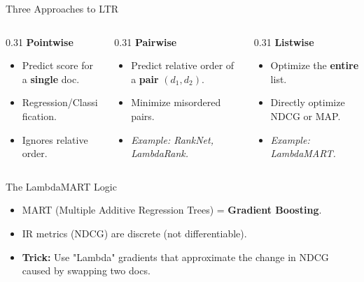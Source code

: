 \documentclass[aspectratio=169]{beamer}
\begin{document}
\begin{frame}{Three Approaches to LTR}
\begin{columns}
\begin{column}{0.31\textwidth}
\textbf{Pointwise}
\begin{itemize}
    \item Predict score for a \textbf{single} doc.
    \item Regression/Classification.
    \item Ignores relative order.
\end{itemize}
\end{column}

\begin{column}{0.31\textwidth}
\textbf{Pairwise}
\begin{itemize}
    \item Predict relative order of a \textbf{pair} $(d_1, d_2)$.
    \item Minimize misordered pairs.
    \item \textit{Example: RankNet, LambdaRank.}
\end{itemize}
\end{column}

\begin{column}{0.31\textwidth}
\textbf{Listwise}
\begin{itemize}
    \item Optimize the \textbf{entire} list.
    \item Directly optimize NDCG or MAP.
    \item \textit{Example: LambdaMART.}
\end{itemize}
\end{column}
\end{columns}
\end{frame}

\begin{frame}{The LambdaMART Logic}
\begin{itemize}
    \item MART (Multiple Additive Regression Trees) = \textbf{Gradient Boosting}.
    \item IR metrics (NDCG) are discrete (not differentiable).
    \item \textbf{Trick:} Use "Lambda" gradients that approximate the change in NDCG caused by swapping two docs.
\end{itemize}

\vspace{1em}
\begin{center}
\end{center}
\end{frame}
\end{document}
